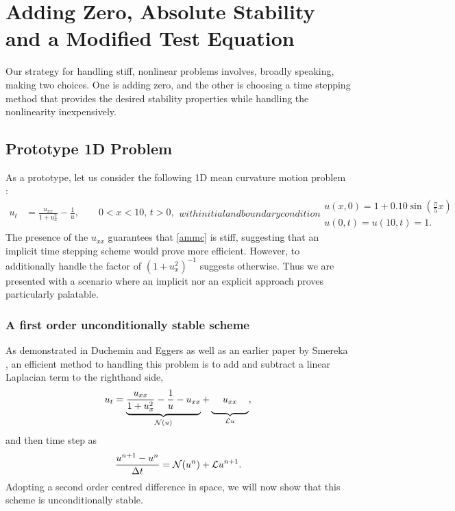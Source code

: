 \chapter{Adding Zero, Absolute Stability and a Modified Test Equation}
Our strategy for handling stiff, nonlinear problems involves, broadly speaking, making two choices. One is adding zero, and the other is choosing a time stepping method that provides the desired stability properties while handling the nonlinearity inexpensively. 

\section{Prototype 1D Problem}
As a prototype, let us consider the following 1D mean curvature motion problem \cite{duchemin2014explicit}: 
\begin{subequations} 
\begin{align}
u_t &= \frac{u_{xx}}{1 + u_x^2} - \frac{1}{u}, 
\qquad 0 < x < 10, \, t > 0,
\end{align}
with initial and boundary condition
\begin{gather}
u(x,0) = 1 + 0.10\sin\left( \frac{\pi}{5}x \right) 
\\
u(0,t)=u(10,t)=1.
\end{gather}
\label{ammc}
\end{subequations}
The presence of the $u_{xx}$ guarantees that \eqref{ammc} is stiff, suggesting that an implicit time stepping scheme would prove more efficient. However, to additionally handle the factor of $(1+u_x^2)^{-1}$ suggests otherwise. Thus we are presented with a scenario where an implicit nor an explicit approach proves particularly palatable.

\subsection{A first order unconditionally stable scheme}
As demonstrated in Duchemin and Eggers \cite{duchemin2014explicit} as well as an earlier paper by Smereka \cite{smereka2003semi}, an efficient method to handling this problem is to add and subtract a linear Laplacian term to the righthand side, 
\begin{align}
u_t = \underbrace{\frac{u_{xx}}{1 + u_x^2} 
- \frac{1}{u} 
- u_{xx}}_{\N(u)} 
+ \underbrace{\phantom{\frac{1_1}{1}}u_{xx}\phantom{\frac{1}{1_1}}}_{\L u}, 
\end{align} 
and then time step as 
\begin{align}
\frac{u^{n+1} - u^n}{\Delta t} 
= \mathcal{N}(u^n) + \mathcal{L} u^{n+1}.
\end{align}
Adopting a second order centred difference in space, we will now show that this scheme is unconditionally stable.

